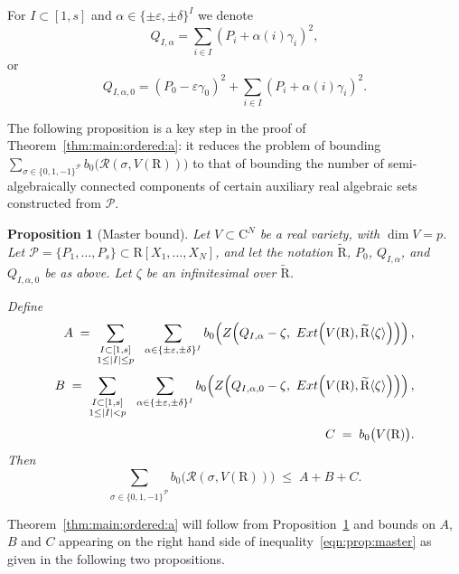\documentclass[10pt]{amsart}
\newtheorem{proposition}{Proposition}[section]
\theoremstyle{definition}
\theoremstyle{remark}
\numberwithin{equation}{section}
\newcommand {\R} {\mathrm{R}}
\newcommand {\C}     {\mathrm{C}}
\newcommand {\ZZ} {{\rm Z}}
\newcommand {\RR} {{\mathcal R}}
\newcommand {\eps} {{\varepsilon}}
\newcommand {\E} {{\rm Ext}}
\begin{document}
For $I  \subset [1,s]$ and $\alpha \in \{\pm \eps, \pm \delta\}^I$
we denote
\[
Q_{I,\alpha} = \sum_{i \in I} \left(P_i + \alpha(i)\gamma_i\right)^2, 
\]
or
\[
Q_{I,\alpha,0} = \left(P_0 - \eps \gamma_0 \right)^2 + \sum_{i \in I} \left(P_i + \alpha(i)\gamma_i\right)^2.
\]

The following proposition is a key step in the proof of Theorem~\ref{thm:main:ordered:a}:
it reduces the problem of bounding
$\sum_{\sigma\in\{0,1,-1\}^{\mathcal P}} b_0\bigl(\RR(\sigma,V(\R))\bigr)$
to that of bounding the number of semi-algebraically connected components of certain
auxiliary real algebraic sets constructed from $\mathcal{P}$.


\begin{proposition}[Master bound]
\label{prop:master}
Let $V\subset \C^N$ be a real variety, with $\dim V = p$.
Let $\mathcal P=\{P_1,\dots,P_s\}\subset \R[X_1,\dots,X_N]$, and let the notation
$\widetilde{\R}$, $P_0$, $Q_{I,\alpha}$, and $Q_{I,\alpha,0}$ be as above. 
Let $\zeta$ be an infinitesimal over $\widetilde{\R}$.

Define
\begin{align}
\label{not:prop:master:A}
A \;=\;
\sum_{\substack{I\subset[1,s]\\ 1\le |I|\leq p}}
\ \ \sum_{\alpha\in\{\pm\varepsilon,\pm\delta\}^I}
b_0\!\left(\ZZ\!\left(Q_{I,\alpha} - \zeta,\ \E\!\left(V(\R),\widetilde{\R}\langle\zeta\rangle\right)\right)\right),\\[1mm]
\label{not:prop:master:B}
B
\;=\;
\sum_{\substack{I\subset[1,s]\\ 1\le |I|<p}}
\ \ \sum_{\alpha\in\{\pm\varepsilon,\pm\delta\}^I}
b_0\!\left(\ZZ\!\left(Q_{I,\alpha,0}-\zeta,\ \E\!\left(V(\R),\widetilde{\R}\langle\zeta\rangle\right)\right)\right),
\\[1mm]
\label{not:prop:master:C}
C \;=\; b_0\bigl(V(\R)\bigr).
\end{align}
Then
\begin{equation}
    \label{eqn:prop:master}
\sum_{\sigma\in\{0,1,-1\}^{\mathcal P}} b_0\bigl(\RR(\sigma,V(\R))\bigr)
\;\le\; 
A+B+C.
\end{equation}
\end{proposition}





Theorem~\ref{thm:main:ordered:a} will follow from Proposition~\ref{prop:master} and 
bounds on 
$A$, $B$
and $C$ appearing on the right hand side of inequality~\eqref{eqn:prop:master} as given in the following two propositions.
\end{document}
